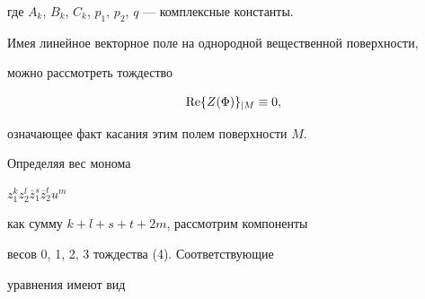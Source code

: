 где $ A_k$, $B_k$, $C_k$, $p_1$, $ p_2$, $q $ --- комплексные константы.





Имея линейное векторное поле на однородной вещественной поверхности, 


можно рассмотреть тождество


\begin{equation}


 \re \{ Z(\Phi) \}_{|M} \equiv 0,


\end{equation}


означающее факт касания этим полем поверхности $M$.





Определяя вес монома 


$ z_1^k z_2^l \overline z_1^s \overline z_2^t u^m $


как сумму $ k + l + s + t + 2m $, рассмотрим компоненты 


весов 0, 1, 2, 3 тождества (4). Соответствующие 


уравнения имеют вид


